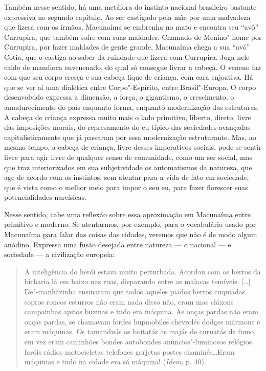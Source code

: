 Também nesse sentido, há uma metáfora do instinto nacional brasileiro
bastante expressiva no segundo capítulo. Ao ser castigado pela mãe por
uma malvadeza que fizera com os irmãos, Macunaíma se embrenha no mato e
encontra seu ``avô'' Currupira, que também sofre com suas maldades.
Chamado de Menino"-home por Currupira, por fazer maldades de gente
grande, Macunaíma chega a sua ``avó'' Cotia, que o castiga ao saber da
ruindade que fizera com Currupira. Joga nele caldo de mandioca
envenenado, do qual só consegue livrar a cabeça. O veneno faz com
que seu corpo cresça e sua cabeça fique de criança, com cara enjoativa.
Há que se ver aí uma dialética entre Corpo"-Espírito, entre
Brasil"-Europa. O corpo desenvolvido expressa a dimensão, a força, o
gigantismo, o crescimento, o amadurecimento do país enquanto forma,
enquanto modernização das estruturas. A cabeça de criança expressa muito
mais o lado primitivo, liberto, direto, livre das imposições morais, do
represamento do eu típico das sociedades avançadas capitalisticamente
que já passaram por essa modernização estruturante. Mas, ao mesmo tempo,
a cabeça de criança, livre desses imperativos sociais, pode se sentir
livre para agir livre de qualquer senso de comunidade, como um ser
social, mas que traz interiorizados em sua subjetividade os automatismos
da natureza, que age de acordo com os instintos, sem atentar para a vida
de fato em sociedade, que é vista como o melhor meio para impor o seu
eu, para fazer florescer suas potencialidades narcísicas.

Nesse sentido, cabe uma reflexão sobre essa aproximação em Macunaíma
entre primitivo e moderno. Se atentarmos, por exemplo, para o
vocabulário usado por Macunaíma para falar das coisas das cidades,
veremos que não é de modo algum anódino. Expressa uma fusão desejada
entre natureza --- o nacional --- e sociedade --- a civilização europeia:

\begin{quote}
A inteligência do herói estava muito perturbada. Acordou com os berros
da bicharia lá em baixo nas ruas, disparando entre as malocas temíveis.
[\ldots{}] De"-manhãzinha ensinaram que todos aqueles piados berros
cuquiadas sopros roncos esturros não eram nada disso não, eram mas
cláxons campainhas apitos buzinas e tudo era máquina. As onças pardas
não eram onças pardas, se chamavam fordes hupmobiles chevrolés dodges
mármons e eram máquinas. Os tamanduás os boitatás as inajás de curuatás
de fumo, em vez eram caminhões bondes autobondes anúncios"-luminosos
relógios faróis rádios motocicletas telefones gorjetas postes
chaminés\ldots{}Eram máquinas e tudo na cidade era só máquina! (\emph{Idem},
p. 40).
\end{quote}

